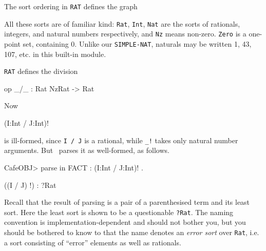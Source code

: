 \documentclass[a4paper]{memoir}
\begin{document}
The sort ordering in \verb|RAT| defines the graph
\begin{center}
\end{center}
All these sorts are of familiar kind:
\verb|Rat|, \verb|Int|, \verb|Nat| are the sorts of rationals, integers, and
natural numbers respectively, and \verb|Nz| means non-zero. \verb|Zero| is
a one-point set, containing 0. Unlike our \verb|SIMPLE-NAT|, naturals may
be written 1, 43, 107, etc. in this built-in module.

\verb|RAT| defines the division
\begin{vvtm}
\begin{ccode}
   op _/_ : Rat NzRat -> Rat
\end{ccode}
\end{vvtm}
Now
\begin{vvtm}
\begin{ccode}
   (I:Int / J:Int)!
\end{ccode}
\end{vvtm}
is ill-formed, since \verb|I / J| is a rational, while \verb|_!| takes
only natural number arguments. But \cafeobj~parses it as well-formed,
as follows.
\begin{vvtm}
\begin{ccode}
  CafeOBJ> parse in FACT : (I:Int / J:Int)! .

  ((I / J) !) : ?Rat
\end{ccode}
\end{vvtm}
Recall that the result of parsing is a pair of a parenthesised term and
its least sort. Here the least sort is shown to be a questionable
\verb|?Rat|. The naming convention is implementation-dependent and
should not bother you, but you should be bothered to know to that
the name denotes an {\em error sort}
over \verb|Rat|, i.e. a sort consisting
of ``error'' elements as well as rationals.
\end{document}
